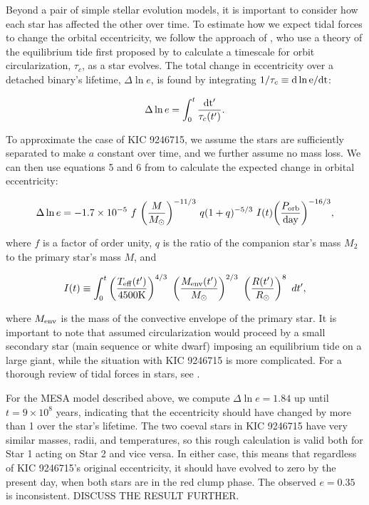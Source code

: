 Beyond a pair of simple stellar evolution models, it is important to consider how each star has affected the other over time. To estimate how we expect tidal forces to change the orbital eccentricity, we follow the approach of \citet{ver95}, who use a theory of the equilibrium tide first proposed by \citet{zah77} to calculate a timescale for orbit circularization, $\tau_c$, as a star evolves. The total change in eccentricity over a detached binary's lifetime, $\Delta \ln e$, is found by integrating $1/\tau_c \equiv \rm{d} \ln e / \rm{d}t$:

\begin{equation}\label{circ}
\Delta \ln e = \int_0^t \frac{\rm{d}t'}{\tau_c(t')}.
\end{equation}

To approximate the case of KIC 9246715, we assume the stars are sufficiently separated to make $a$ constant over time, and we further assume no mass loss. We can then use equations 5 and 6 from \citet{ver95} to calculate the expected change in orbital eccentricity:

\begin{equation}\label{tide1}
\Delta \ln e = -1.7 \times 10^{-5} \ f \ {\left( \frac{M}{M_{\odot}} \right)}^{-11/3} \ q(1+q)^{-5/3} \ I(t) {\left( \frac{P_{\rm{orb}}}{\rm{day}} \right)}^{-16/3},
\end{equation}

where $f$ is a factor of order unity, $q$ is the ratio of the companion star's mass $M_2$ to the primary star's mass $M$, and

\begin{equation}
I(t) \equiv \int_0^t \left( \frac{T_{\rm{eff}}(t')}{4500 \rm{K}} \right)^{4/3} \ \left( \frac{M_{\rm{env}}(t')}{M_{\odot}} \right)^{2/3} \ \left( \frac{R(t')}{R_{\odot}} \right)^8 \ dt',
\end{equation}

where $M_{\rm{env}}$ is the mass of the convective envelope of the primary star. It is important to note that \citet{ver95} assumed circularization would proceed by a small secondary star (main sequence or white dwarf) imposing an equilibrium tide on a large giant, while the situation with KIC 9246715 is more complicated. For a thorough review of tidal forces in stars, see \citet{ogi14}.

For the MESA model described above, we compute $\Delta \ln e = 1.84$ up until $t = 9 \times 10^8$ years, indicating that the eccentricity should have changed by more than 1 over the star's lifetime. The two coeval stars in KIC 9246715 have very similar masses, radii, and temperatures, so this rough calculation is valid both for Star 1 acting on Star 2 and vice versa. In either case, this means that regardless of KIC 9246715's original eccentricity, it should have evolved to zero by the present day, when both stars are in the red clump phase. The observed $e = 0.35$ is inconsistent. DISCUSS THE RESULT FURTHER.

